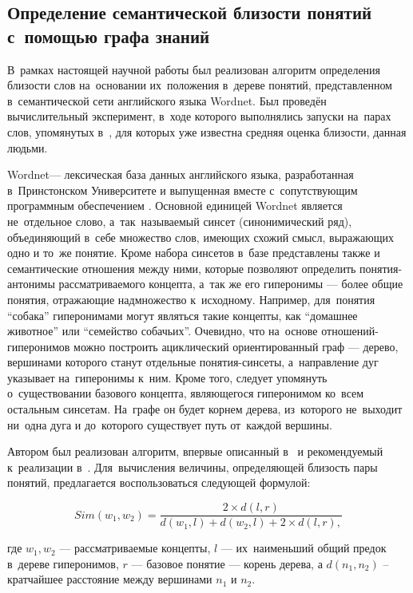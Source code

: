\subsection{Определение семантической близости понятий с~помощью графа знаний}

В~рамках настоящей научной работы был реализован алгоритм определения близости слов
на~основании их~положения в~дереве понятий, представленном в~семантической сети
английского языка Wordnet\cite{wordnet}.
Был проведён вычислительный эксперимент, в~ходе которого выполнялись запуски на~парах слов, упомянутых в~\cite{complexSim},
для которых уже известна средняя оценка близости, данная людьми.

Wordnet--- лексическая база данных английского языка,
разработанная в~Принстонском Университете и выпущенная вместе с~сопутствующим программным обеспечением \cite{wordnet}.
Основной единицей Wordnet является не~отдельное слово, 
а~так~называемый синсет (синонимический ряд),
объединяющий в~себе множество слов, имеющих схожий смысл, выражающих одно и то~же понятие.
Кроме набора синсетов в~базе представлены также и семантические отношения между ними,
которые позволяют определить понятия-антонимы рассматриваемого концепта,
а~так же его гиперонимы --- более общие понятия, отражающие надмножество к~исходному.
Например, для~понятия ``собака'' гиперонимами могут являться такие концепты,
как ``домашнее животное'' или ``семейство собачьих''.
Очевидно, что на~основе отношений-гиперонимов можно построить ациклический ориентированный граф --- 
дерево, вершинами которого станут отдельные понятия-синсеты, 
а~направление дуг указывает на~гиперонимы к~ним.
Кроме того, следует упомянуть о~существовании базового концепта, 
являющегося гиперонимом ко~всем остальным синсетам. 
На~графе он будет корнем дерева,
из~которого не~выходит ни~одна дуга и до~которого существует путь от~каждой вершины.

Автором был реализован алгоритм, впервые описанный  в~
\cite{inproceedings} и 
рекомендуемый к~реализации в~\cite{complexSim}.
Для~вычисления величины, определяющей близость пары понятий, 
предлагается воспользоваться следующей формулой:

$$ Sim(w_1, w_2) = \frac{ 2\times d(l, r) }
	               { d(w_1, l) + d(w_2, l) + 2\times d(l,r), }$$

где $w_1,w_2$ --- рассматриваемые концепты, 
$l$ --- их~наименьший общий предок в~дереве гиперонимов,
$r$ --- базовое понятие --- корень дерева, 
а $d(n_1,n_2)$ -- 
кратчайшее расстояние между вершинами $n_1$ и $n_2$.


